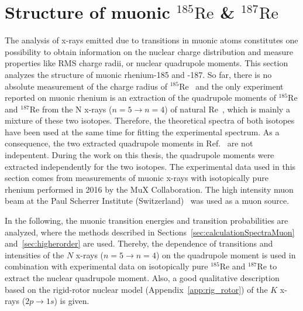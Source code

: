 \section{Structure of muonic $^{185}\text{Re}$ \& $^{187}\text{Re}$}
\label{sec:muon_re}
The analysis of x-rays emitted due to transitions in muonic atoms constitutes one possibility to obtain information on the nuclear charge distribution and measure properties like RMS charge radii, or nuclear quadrupole moments. This section analyzes the structure of muonic rhenium-185 and -187. So far, there is no absolute measurement of the charge radius of $^{185}$Re~\cite{schopper2004} and the only experiment reported on muonic rhenium is an extraction of the quadrupole moments of $^{185}$Re and $^{187}$Re from the N x-rays (${n}{=}{5}\rightarrow{n}{=}{4}$) of natural Re~\cite{konijn1979}, which is mainly a mixture of these two isotopes. Therefore, the theoretical spectra of both isotopes have been used at the same time for fitting the experimental spectrum. As a consequence, the two extracted quadrupole moments in Ref.~\cite{konijn1979} are not indepentent. During the work on this thesis, the quadrupole moments were extracted independently for the two isotopes.
The experimental data used in this section comes from measurements of muonic x-rays with isotopically pure rhenium performed in 2016 by the MuX Collaboration. The high intensity muon beam at the Paul Scherrer Institute (Switzerland)~\cite{psiExperiments,psiFacilities} was used as a muon source.

In the following, the muonic transition energies and transition probabilities are analyzed, where the methods described in Sections~\ref{sec:calculationSpectraMuon} and~\ref{sec:higherorder} are used. Thereby, the dependence of transitions and intensities of the $N$ x-rays ($n=5\rightarrow n=4$) on the quadrupole moment is used in combination with experimental data on isotopically pure $^{185}$Re and $^{187}$Re to extract the nuclear quadrupole moment. Also, a good qualitative description based on the rigid-rotor nuclear model (Appendix~\ref{app:rig_rotor}) of the $K$ x-rays ($2p\rightarrow 1s$) is given.


